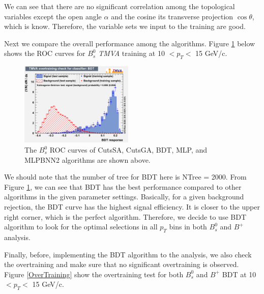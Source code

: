 We can see that there are no significant correlation among the topological variables except the open angle $\alpha$ and the cosine its transverse projection $ \cos\theta$, which is know. Therefore, the variable sets we input to the  training are good.  

Next we compare the overall performance among the algorithms. Figure \ref{ROCAll} below shows the ROC curves for $B^0_s$ \textit{TMVA} training at 10 $< p_T < $ 15 GeV/c.

\begin{figure}[h]
\begin{center}
\includegraphics[width= 0.48\textwidth]{Figures/Chapter5/BPOT.pdf}
\caption{The $B^0_s$ ROC curves of CutsSA, CutsGA, BDT, MLP, and MLPBNN2 algorithms are shown above.}
\label{ROCAll}
\end{center}
\end{figure}

We should note that the number of tree for BDT here is NTree = 2000. From Figure \ref{ROCAll}, we can see that BDT has the best performance compared to other algorithms in the given parameter settings. Basically, for a given background rejection, the BDT curve has the highest signal efficiency. It is closer to the upper right corner, which is the perfect algorithm. Therefore, we decide to use BDT algorithm to look for the optimal selections in all $p_T$ bins in both $B^0_s$ and $B^+$ analysis.


Finally, before, implementing the BDT algorithm to the analysis, we also check the overtraining and make sure that no significant overtraining is observed. Figure \ref{OverTraining} show the overtraining test for both $B^0_s$ and $B^+$ BDT at 10 $< p_T < $ 15 GeV/c. 


